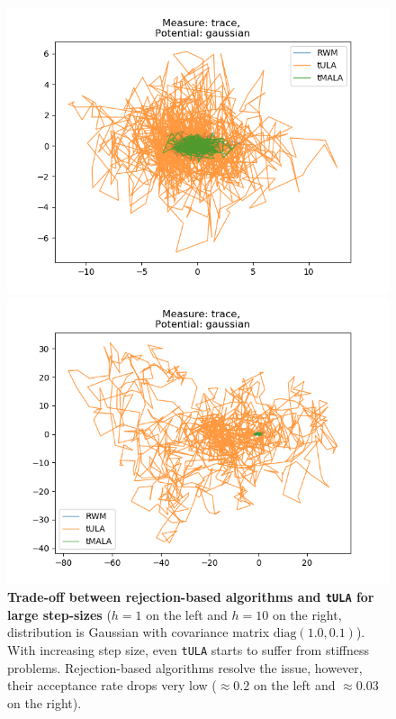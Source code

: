 \begin{figure}[H]
\centering
  \begin{minipage}[b]{0.49\textwidth}
  \centering
    \includegraphics[width=\textwidth]{Figures/tula_tmala_step_1.png}
  \end{minipage} %
  \begin{minipage}[b]{0.49\textwidth}
  \centering
    \includegraphics[width=\textwidth]{Figures/tula_tmala_step_10.png}
  \end{minipage}
   \caption{\textbf{Trade-off between rejection-based algorithms and \texttt{tULA} for large step-sizes} ($h = 1$ on the left and $h = 10$ on the right, distribution is Gaussian with covariance matrix $\text{diag}(1.0, 0.1)$). With increasing step size, even \texttt{tULA} starts to suffer from stiffness problems. Rejection-based algorithms resolve the issue, however, their acceptance rate drops very low ($\approx 0.2$ on the left and $\approx 0.03$ on the right). }
\end{figure}



